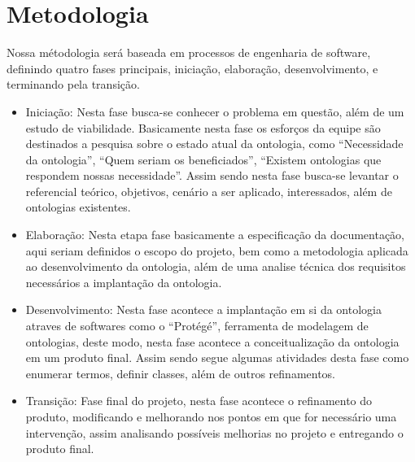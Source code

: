\chapter[metodologia]{Metodologia}\label{cap}
Nossa métodologia será baseada em processos de engenharia de software, definindo quatro fases principais, iniciação, elaboração, desenvolvimento, e terminando pela transição.

\begin{itemize}
 	\item Iniciação: Nesta fase busca-se conhecer o problema em questão, além de um estudo de viabilidade. Basicamente nesta fase os esforços da equipe são destinados a pesquisa sobre o estado atual da ontologia, como “Necessidade da ontologia”, “Quem seriam os beneficiados”, “Existem ontologias que respondem nossas necessidade”. Assim sendo nesta fase busca-se levantar o referencial teórico, objetivos, cenário a ser aplicado, interessados, além de ontologias existentes.
 	\item Elaboração: Nesta etapa fase basicamente a especificação da documentação, aqui seriam definidos o escopo do projeto, bem como a metodologia aplicada ao desenvolvimento da ontologia, além de uma analise técnica dos requisitos necessários a implantação da ontologia.
	\item Desenvolvimento: Nesta fase acontece a implantação em si da ontologia atraves de softwares como o “Protégé”, ferramenta de modelagem de ontologias, deste modo, nesta fase acontece a conceitualização da ontologia em um produto final. Assim sendo segue algumas atividades desta fase como enumerar termos, definir classes, além de outros refinamentos.
	\item Transição: Fase final do projeto, nesta fase acontece o refinamento do produto, modificando e melhorando nos pontos em que for necessário uma intervenção, assim analisando possíveis melhorias no projeto e entregando o produto final.
\end{itemize}